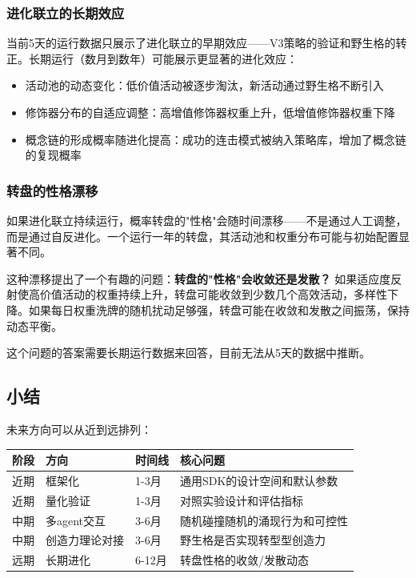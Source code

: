 \documentclass[12pt,a4paper]{ctexart}
\begin{document}
\subsubsection{进化联立的长期效应}

当前5天的运行数据只展示了进化联立的早期效应——V3策略的验证和野生格的转正。长期运行（数月到数年）可能展示更显著的进化效应：

\begin{itemize}[nosep]
\item 活动池的动态变化：低价值活动被逐步淘汰，新活动通过野生格不断引入
\item 修饰器分布的自适应调整：高增值修饰器权重上升，低增值修饰器权重下降
\item 概念链的形成概率随进化提高：成功的连击模式被纳入策略库，增加了概念链的复现概率
\end{itemize}

\subsubsection{转盘的性格漂移}

如果进化联立持续运行，概率转盘的"性格"会随时间漂移——不是通过人工调整，而是通过自反进化。一个运行一年的转盘，其活动池和权重分布可能与初始配置显著不同。

这种漂移提出了一个有趣的问题：\textbf{转盘的"性格"会收敛还是发散？} 如果适应度反射使高价值活动的权重持续上升，转盘可能收敛到少数几个高效活动，多样性下降。如果每日权重洗牌的随机扰动足够强，转盘可能在收敛和发散之间振荡，保持动态平衡。

这个问题的答案需要长期运行数据来回答，目前无法从5天的数据中推断。

\subsection{小结}

未来方向可以从近到远排列：

\begin{table}[h]
\centering
\begin{tabular}{llll}
\toprule
阶段 & 方向 & 时间线 & 核心问题 \\
\midrule
近期 & 框架化 & 1-3月 & 通用SDK的设计空间和默认参数 \\
近期 & 量化验证 & 1-3月 & 对照实验设计和评估指标 \\
中期 & 多agent交互 & 3-6月 & 随机碰撞随机的涌现行为和可控性 \\
中期 & 创造力理论对接 & 3-6月 & 野生格是否实现转型型创造力 \\
远期 & 长期进化 & 6-12月 & 转盘性格的收敛/发散动态 \\
\bottomrule
\end{tabular}
\end{table}
\end{document}
